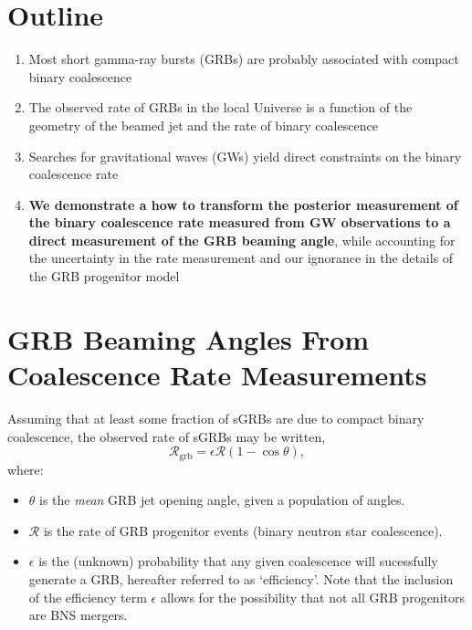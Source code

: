 \documentclass[a0,landscape]{a0poster}
\newcommand{\grbrate}{{{\mathcal R}_{\mathrm{grb}}}}
\newcommand{\cbcrate}{{{\mathcal R}}}
\def\gw#1{gravitational wave#1 (GW#1)\gdef\gw{GW}}
\def\grb#1{gamma-ray burst#1 (GRB#1)\gdef\grb{GRB}}
\begin{document}
\begin{multicols}{4}
\color{DarkSlateGray} %

\section*{\centering Outline}

\begin{enumerate}
    \item Most short \grb{s} are probably associated with
        compact binary coalescence
    \item The observed rate of \grb{s} in the local Universe is a function of the
        geometry of the beamed jet and the rate of binary coalescence
    \item Searches for \gw{s} yield direct constraints on the binary coalescence
        rate
    \item {\bf We demonstrate a how to transform the posterior measurement of
            the binary coalescence rate measured from \gw{} observations to a
        direct measurement of the \grb{} beaming angle}, while accounting for
            the uncertainty in the rate measurement and our ignorance in the
            details of the \grb{} progenitor model
\end{enumerate}


\section*{\centering GRB Beaming Angles From Coalescence Rate Measurements}
Assuming that at least some fraction of sGRBs are due to compact binary
coalescence, the observed rate of sGRBs may be written,
%
\begin{equation}\label{eq:rate2angle}
\grbrate=\epsilon\cbcrate(1-\cos \theta),
\end{equation}
%
where:
\begin{itemize}
    \item $\theta$ is the \emph{mean} GRB jet opening angle, given a population
        of angles.%
    \item $\cbcrate$ is the rate of GRB progenitor events (binary
        neutron star coalescence).  
    \item $\epsilon$ is the (unknown) probability that any given coalescence will
        sucessfully generate a GRB, hereafter referred to as `efficiency'.  Note
        that the inclusion of the efficiency term $\epsilon$ allows for the
        possibility that not all GRB progenitors are BNS mergers.
\end{itemize}


\end{multicols}
\end{document}
